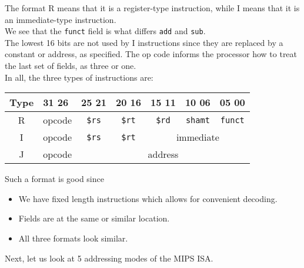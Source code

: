 \documentclass{article}
\begin{document}
		The format R means that it is a register-type instruction, while I means that it is an immediate-type instruction.\\
		We see that the \texttt{funct} field is what differs \texttt{add} and \texttt{sub}.\\
		The lowest 16 bits are not used by I instructions since they are replaced by a constant or address, as specified. The op code informs the processor how to treat the last set of fields, as three or one.\\

		In all, the three types of instructions are:
		\begin{center}
		\begin{tabular}{|c||p{2cm}|p{1.6cm}|p{1.6cm}|p{1.6cm}|p{1.6cm}|p{2cm}|}
			\hline
			Type & 31 \hfill 26 & 25 \hfill 21 & 20 \hfill 16 & 15 \hfill 11 & 10 \hfill 06 & 05 \hfill 00 \\ \hline
			R & \multicolumn{1}{c|}{opcode} & \multicolumn{1}{c|}{\texttt{\$rs}} & \multicolumn{1}{c|}{\texttt{\$rt}} & \multicolumn{1}{c|}{\texttt{\$rd}} & \multicolumn{1}{c|}{\texttt{shamt}} & \multicolumn{1}{c|}{\texttt{funct}} \\ \hline
			I & \multicolumn{1}{c|}{opcode} & \multicolumn{1}{c|}{\texttt{\$rs}} & \multicolumn{1}{c|}{\texttt{\$rt}} & \multicolumn{3}{c|}{immediate} \\ \hline
			J & \multicolumn{1}{c|}{opcode} & \multicolumn{5}{c|}{address} \\ \hline
		\end{tabular}
		\end{center}

		Such a format is good since
		\begin{itemize}
			\item We have fixed length instructions which allows for convenient decoding.
			\item Fields are at the same or similar location.
			\item All three formats look similar.
		\end{itemize}

		Next, let us look at 5 addressing modes of the MIPS ISA.
\end{document}
